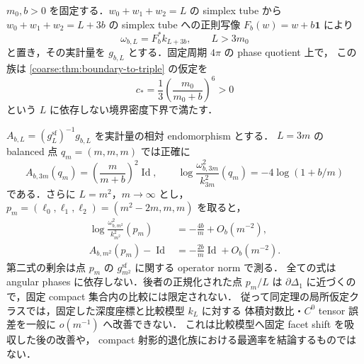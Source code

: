 \begin{proposition}[固定深度座標における局所安定性率の最適性]
\label{simplex:prop:boundary-floor-sharpness}
$m_0,b>0$ を固定する．$w_0+w_1+w_2=L$ の simplex tube から
$w_0+w_1+w_2=L+3b$ の simplex tube への正則写像
$F_b(w)=w+b\mathbf1$ により
\[
 \omega_{b,L}=F_b^*k_{L+3b},\qquad L>3m_0
\]
と置き，その実計量を $g_{b,L}$ とする．固定周期 $4\pi$ の phase quotient 上で，
この族は \cref{coarse:thm:boundary-to-triple} の仮定を
\begin{equation}\label{simplex:eq:shifted-model-face-floor}
 c_*=\frac13\left(\frac{m_0}{m_0+b}\right)^6>0
\end{equation}
という $L$ に依存しない境界密度下界で満たす．

$A_{b,L}=(g_L^{\mathrm{sf}})^{-1}g_{b,L}$ を実計量の相対 endomorphism とする．
$L=3m$ の balanced 点 $q_m=(m,m,m)$ では正確に
\begin{equation}\label{simplex:eq:shifted-model-balanced}
 A_{b,3m}(q_m)=\left(\frac{m}{m+b}\right)^2\operatorname{Id},
 \qquad
 \log\frac{\omega_{b,3m}^2}{k_{3m}^2}(q_m)
       =-4\log(1+b/m)
\end{equation}
である．さらに $L=m^2$，$m\to\infty$ とし，
$p_m=(\ell_0,\ell_1,\ell_2)=(m^2-2m,m,m)$ を取ると，
\begin{align}
 \log\frac{\omega_{b,m^2}^2}{k_{m^2}^2}(p_m)
   &=-\frac{4b}{m}+O_b(m^{-2}),
       \label{simplex:eq:shifted-model-volume-leading}\\
 A_{b,m^2}(p_m)-\operatorname{Id}
   &=-\frac{2b}{m}\operatorname{Id}+O_b(m^{-2}).
       \label{simplex:eq:shifted-model-tensor-leading}
\end{align}
第二式の剰余は点 $p_m$ の $g_{m^2}^{\mathrm{sf}}$ に関する operator norm で測る．
全ての式は angular phases に依存しない．後者の正規化された点 $p_m/L$ は
$\partial\Delta_1$ に近づくので，固定 compact 集合内の比較には限定されない．
従って同定理の局所仮定クラスでは，固定した深度座標と比較模型 $k_L$ に対する
体積対数比・$C^0$ tensor 誤差を一般に $o(m^{-1})$ へ改善できない．
これは比較模型へ固定 facet shift を吸収した後の改善や，
compact 射影的退化族における最適率を結論するものではない．
\end{proposition}

